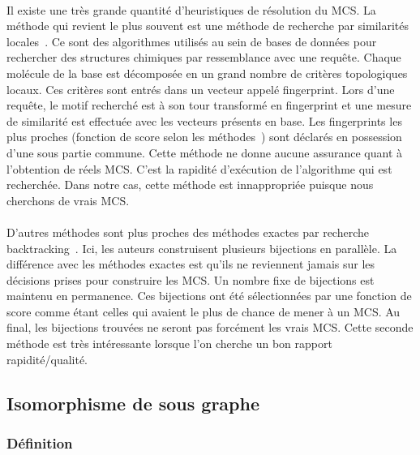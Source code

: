 \documentclass[12pt,french,twoside]{report}
\begin{document}
\paragraph{}Il existe une très grande quantité d'heuristiques de résolution du MCS.
La méthode qui revient le plus souvent est une méthode de recherche par similarités locales~\cite{yan_substructure_2005,willett_similarity_2011}.
Ce sont des algorithmes utilisés au sein de bases de données pour rechercher des structures chimiques par ressemblance avec une requête.
Chaque molécule de la base est décomposée en un grand nombre de critères topologiques locaux.
Ces critères sont entrés dans un vecteur appelé fingerprint.
Lors d'une requête, le motif recherché est à son tour transformé en fingerprint et une mesure de similarité est effectuée avec les vecteurs présents en base.
Les fingerprints les plus proches (fonction de score selon les méthodes~\cite{maggiora_molecular_2011,ndiaye_cp_2011}) sont déclarés en possession d'une sous partie commune.
Cette méthode ne donne aucune assurance quant à l'obtention de réels MCS.
C'est la rapidité d'exécution de l'algorithme qui est recherchée.
Dans notre cas, cette méthode est innappropriée puisque nous cherchons de vrais MCS.

\paragraph{}D'autres méthodes sont plus proches des méthodes exactes par recherche backtracking~\cite{grosso_simple_2008, wang_fmcsr:_2013}.
Ici, les auteurs construisent plusieurs bijections en parallèle.
La différence avec les méthodes exactes est qu'ils ne reviennent jamais sur les décisions prises pour construire les MCS.
Un nombre fixe de bijections est maintenu en permanence.
Ces bijections ont été sélectionnées par une fonction de score comme étant celles qui avaient le plus de chance de mener à un MCS.
Au final, les bijections trouvées ne seront pas forcément les vrais MCS.
Cette seconde méthode est très intéressante lorsque l'on cherche un bon rapport rapidité/qualité.


\subsection{Isomorphisme de sous graphe}

\subsubsection{Définition}
\end{document}
